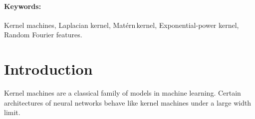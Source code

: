 \documentclass{article}
\def\matern{Mat\'ern\,}
\def\cite{\citep}
\theoremstyle{plain}
\begin{document}

\printAffiliationsAndNotice{} 

\begin{abstract}
Recent applications of kernel methods in machine learning have seen a renewed interest in the Laplacian kernel, due to its stability to the bandwidth hyperparameter in comparison to the Gaussian kernel, as well as its expressivity being equivalent to that of the neural tangent kernel of deep fully connected networks. However, unlike the Gaussian kernel, the Laplacian kernel is not separable. This poses challenges for techniques to approximate it, especially via the random Fourier features (RFF) methodology and its variants. In this work, we provide random features for the Laplacian kernel and its two generalizations: \matern kernel and the Exponential power kernel. We provide efficiently implementable schemes to sample weight matrices so that random features approximate these kernels. These weight matrices have a weakly coupled heavy-tailed randomness. Via numerical experiments on real datasets we demonstrate the efficacy of these random feature maps.
\end{abstract}

\paragraph{Keywords:} Kernel machines, Laplacian kernel, \matern kernel, Exponential-power kernel, Random Fourier features.

\section{Introduction}

Kernel machines are a classical family of models in machine learning. Certain architectures of neural networks \cite{lee2017deep,matthews2018gaussian,jacot2018neural} behave like kernel machines under a large width limit.
\end{document}
